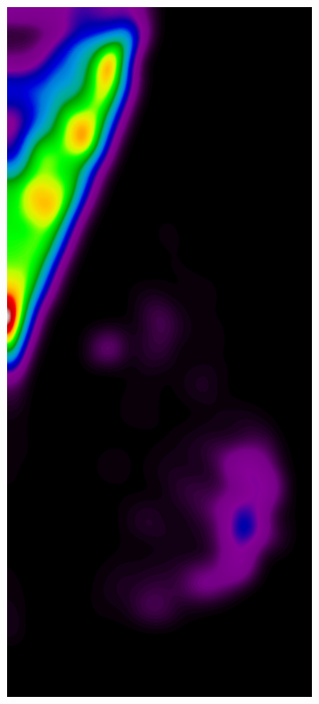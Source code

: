 \begin{figure}[h!]
	\centering
	\begin{subfigure}{0.195\textwidth}
		\centering
			\includegraphics[width=\textwidth]{plots/examples/example5_probs_1_1.png}

\end{subfigure}
\end{figure}
